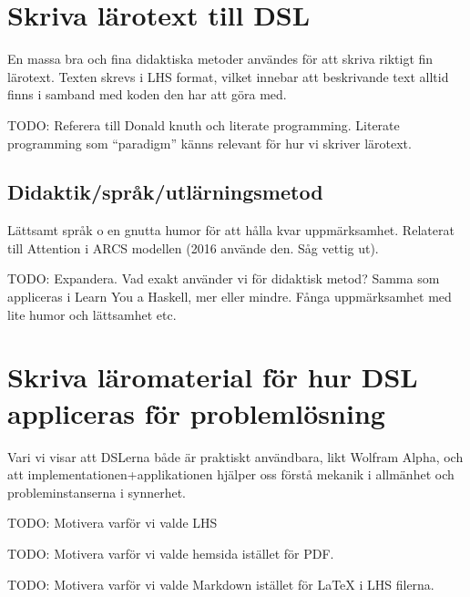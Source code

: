 \begin{binge}
  \section{Skriva lärotext till DSL}

  En massa bra och fina didaktiska metoder användes för att skriva
  riktigt fin lärotext. Texten skrevs i LHS format, vilket innebar att
  beskrivande text alltid finns i samband med koden den har att göra
  med.

  TODO: Referera till Donald knuth och literate programming. Literate
  programming som ``paradigm'' känns relevant för hur vi skriver lärotext.

  \subsection{Didaktik/språk/utlärningsmetod}

  Lättsamt språk o en gnutta humor för att hålla kvar
  uppmärksamhet. Relaterat till Attention i ARCS modellen (2016
  använde den. Såg vettig ut).

  TODO: Expandera. Vad exakt använder vi för didaktisk metod? Samma
  som appliceras i Learn You a Haskell, mer eller mindre. Fånga
  uppmärksamhet med lite humor och lättsamhet etc.

  \section{Skriva läromaterial för hur DSL appliceras för problemlösning}

  Vari vi visar att DSLerna både är praktiskt användbara, likt Wolfram
  Alpha, och att implementationen+applikationen hjälper oss förstå
  mekanik i allmänhet och probleminstanserna i synnerhet.

  TODO: Motivera varför vi valde LHS

  TODO: Motivera varför vi valde hemsida istället för PDF.

  TODO: Motivera varför vi valde Markdown istället för LaTeX i LHS
  filerna.
\end{binge}

